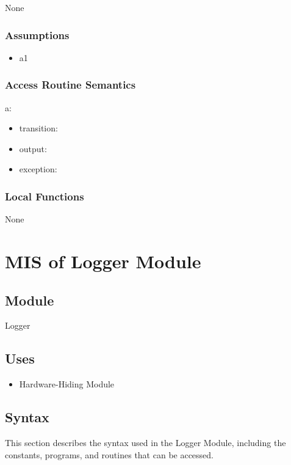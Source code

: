 \documentclass[12pt, titlepage]{article}
\begin{document}
None

\subsubsection{Assumptions}

\begin{itemize}
\item a1
\end{itemize}

\subsubsection{Access Routine Semantics}

\noindent a:
\begin{itemize}
\item transition: 
\item output: 
\item exception: 
\end{itemize}

\subsubsection{Local Functions}

None

\newpage

\section{MIS of Logger Module} \label{MIS_Logger}

\subsection{Module}

Logger

\subsection{Uses}

\begin{itemize}
\item Hardware-Hiding Module
\end{itemize}

\subsection{Syntax}

This section describes the syntax used in the Logger Module, including the
constants, programs, and routines that can be accessed.
\end{document}
